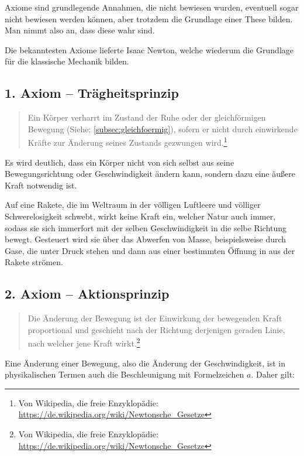 Axiome sind grundlegende Annahmen, die nicht bewiesen wurden, eventuell sogar nicht bewiesen werden können, aber trotzdem die Grundlage einer These bilden. Man nimmt also an, dass diese wahr sind.

Die bekanntesten Axiome lieferte Isaac Newton, welche wiederum die Grundlage für die klassische Mechanik bilden.

\subsection{1. Axiom -- Trägheitsprinzip}

\begin{quote}
\glqq Ein Körper verharrt im Zustand der Ruhe oder der gleichförmigen Bewegung (Siehe: \ref{subsec:gleichfoermig}), sofern er nicht durch einwirkende Kräfte zur Änderung seines Zustands gezwungen wird.\grqq \footnote{Von Wikipedia, die freie Enzyklopädie: \url{https://de.wikipedia.org/wiki/Newtonsche_Gesetze}}
\end{quote}

\noindent Es wird deutlich, dass ein Körper nicht von sich selbst aus seine Bewegungsrichtung oder Geschwindigkeit ändern kann, sondern dazu eine äußere Kraft notwendig ist.

\begin{Beispiel}
	Auf eine Rakete, die im Weltraum in der völligen Luftleere und völliger Schwerelosigkeit schwebt, wirkt keine Kraft ein, welcher Natur auch immer, sodass sie sich immerfort mit der selben Geschwindigkeit in die selbe Richtung bewegt. Gesteuert wird sie über das \glqq Abwerfen\grqq{} von Masse, beispielsweise durch Gase, die unter Druck stehen und dann aus einer bestimmten Öffnung in aus der Rakete strömen.
\end{Beispiel}


\subsection{2. Axiom -- Aktionsprinzip}

\begin{quote}
\glqq Die Änderung der Bewegung ist der Einwirkung der bewegenden Kraft proportional und geschieht nach der Richtung derjenigen geraden Linie, nach welcher jene Kraft wirkt.\grqq \footnote{Von Wikipedia, die freie Enzyklopädie: \url{https://de.wikipedia.org/wiki/Newtonsche_Gesetze}}
\end{quote}

\noindent Eine Änderung einer Bewegung, also die Änderung der Geschwindigkeit, ist in physikalischen Termen auch die \glqq Beschleunigung\grqq{} mit Formelzeichen $a$. Daher gilt:


